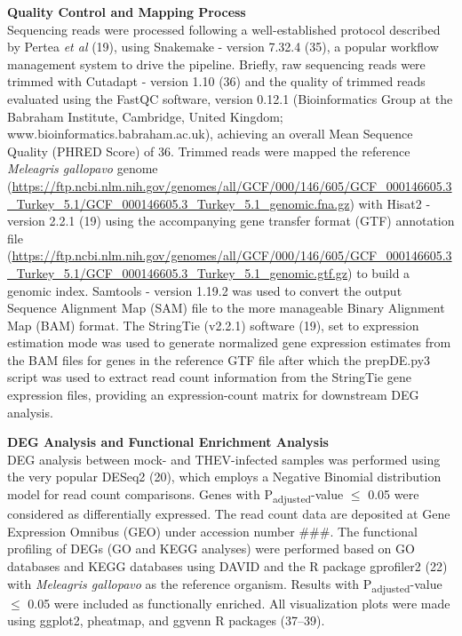 \documentclass[
]{article}
\begin{document}
\textbf{Quality Control and Mapping Process}\\
Sequencing reads were processed following a well-established protocol
described by Pertea \emph{et al} (19), using Snakemake - version 7.32.4
(35), a popular workflow management system to drive the pipeline.
Briefly, raw sequencing reads were trimmed with Cutadapt - version 1.10
(36) and the quality of trimmed reads evaluated using the FastQC
software, version 0.12.1 (Bioinformatics Group at the Babraham
Institute, Cambridge, United Kingdom;
www.bioinformatics.babraham.ac.uk), achieving an overall Mean Sequence
Quality (PHRED Score) of 36. Trimmed reads were mapped the reference
\emph{Meleagris gallopavo} genome
(\url{https://ftp.ncbi.nlm.nih.gov/genomes/all/GCF/000/146/605/GCF_000146605.3_Turkey_5.1/GCF_000146605.3_Turkey_5.1_genomic.fna.gz})
with Hisat2 - version 2.2.1 (19) using the accompanying gene transfer
format (GTF) annotation file
(\url{https://ftp.ncbi.nlm.nih.gov/genomes/all/GCF/000/146/605/GCF_000146605.3_Turkey_5.1/GCF_000146605.3_Turkey_5.1_genomic.gtf.gz})
to build a genomic index. Samtools - version 1.19.2 was used to convert
the output Sequence Alignment Map (SAM) file to the more manageable
Binary Alignment Map (BAM) format. The StringTie (v2.2.1) software (19),
set to expression estimation mode was used to generate normalized gene
expression estimates from the BAM files for genes in the reference GTF
file after which the prepDE.py3 script was used to extract read count
information from the StringTie gene expression files, providing an
expression-count matrix for downstream DEG analysis.

\textbf{DEG Analysis and Functional Enrichment Analysis}\\
DEG analysis between mock- and THEV-infected samples was performed using
the very popular DESeq2 (20), which employs a Negative Binomial
distribution model for read count comparisons. Genes with
P\textsubscript{adjusted}-value \(\leq\) 0.05 were considered as
differentially expressed. The read count data are deposited at Gene
Expression Omnibus (GEO) under accession number \#\#\#. The functional
profiling of DEGs (GO and KEGG analyses) were performed based on GO
databases and KEGG databases using DAVID and the R package gprofiler2
(22) with \emph{Meleagris gallopavo} as the reference organism. Results
with P\textsubscript{adjusted}-value \(\leq\) 0.05 were included as
functionally enriched. All visualization plots were made using ggplot2,
pheatmap, and ggvenn R packages (37--39).
\end{document}
